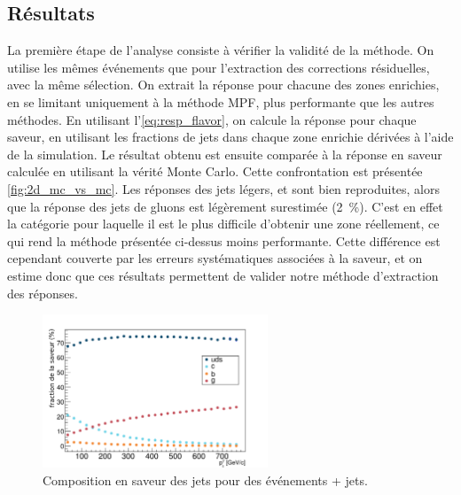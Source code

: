 \subsection{Résultats}

La première étape de l'analyse consiste à vérifier la validité de la méthode. On utilise les mêmes événements que pour l'extraction des corrections résiduelles, avec la même sélection. On extrait la réponse pour chacune des zones enrichies, en se limitant uniquement à la méthode MPF, plus performante que les autres méthodes. En utilisant l'\cref{eq:resp_flavor}, on calcule la réponse pour chaque saveur, en utilisant les fractions de jets dans chaque zone enrichie dérivées à l'aide de la simulation. Le résultat obtenu est ensuite comparée à la réponse en saveur calculée en utilisant la vérité Monte Carlo. Cette confrontation est présentée \cref{fig:2d_mc_vs_mc}. Les réponses des jets légers, \Pcharm et \Pbottom sont bien reproduites, alors que la réponse des jets de gluons est légèrement surestimée (\tilde \SI{2}{\%}). C'est en effet la catégorie pour laquelle il est le plus difficile d'obtenir une zone réellement, ce qui rend la méthode présentée ci-dessus moins performante. Cette différence est cependant couverte par les erreurs systématiques associées à la saveur, et on estime donc que ces résultats permettent de valider notre méthode d'extraction des réponses.

\begin{figure}[tbp]
  \centering
  \includegraphics[width=0.60\textwidth]{chapitre4/figs/flavor/gammajet_flavors.pdf}
  \caption{Composition en saveur des jets pour des événements \Pphoton + jets.}
  \label{fig:gjet_flavor}
\end{figure}

